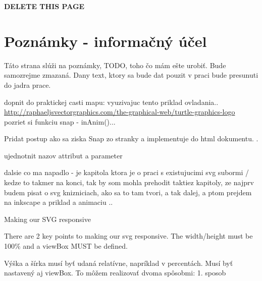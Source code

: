 {\Huge\textbf{ DELETE THIS PAGE}}
\section{Poznámky - informačný účel}
Táto strana slúži na poznámky, TODO, toho čo mám ešte urobiť. 
Bude samozrejme zmazaná.  
Dany text, ktory sa bude dat pouzit v praci bude presunuti do jadra prace. 

dopnit do praktickej casti mapu: vyuzivajuc tento priklad ovladania.. \url{http://raphaeljsvectorgraphics.com/the-graphical-web/turtle-graphics-logo}
pozriet si funkciu snap - inAnim()...


Pridat postup ako sa ziska Snap zo stranky a implementuje do html dokumentu. .

ujednotnit nazov attribut a parameter

dalsie co ma napadlo - je kapitola \cite[p.~81]{Dawber} ktora je o praci s existujucimi svg subormi / kedze to takmer na konci, tak by som mohla prehodit taktiez kapitoly, ze najprv budem pisat o svg knizniciach, ako sa to tam tvori, a tak dalej, a ptom prejdem na inkscape a priklad a animaciu .. 


Making our SVG responsive

There are 2 key points to making our svg responsive. The width/height must be 100\% and a viewBox MUST be defined.

Výška a šírka musí byť udaná relatívne, napríklad v percentách. Musí byť nastavený aj viewBox. 
To môžem realizovať dvoma spôsobmi:
1. sposob

\newpage


